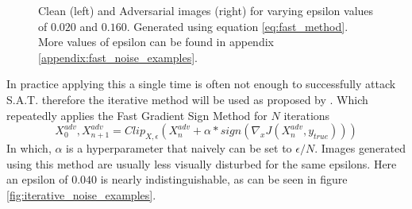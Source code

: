 \begin{figure}[H]
{        %
    }
    \caption{Clean (left) and Adversarial images (right) for varying epsilon values of $0.020$ and $0.160$. Generated using equation \ref{eq:fast_method}. More values of epsilon can be found in appendix \ref{appendix:fast_noise_examples}.}
    \label{fig:fast_noise_examples}
\end{figure}

In practice applying this a single time is often not enough to successfully attack S.A.T. therefore the iterative method will be used as proposed by \citeauthor{Kurakin}. Which repeatedly applies the Fast Gradient Sign Method for $N$ iterations
\begin{equation}
    X^{adv}_{0}, X^{adv}_{n + 1} = Clip_{X, \epsilon}(X^{adv}_{n} + \alpha * sign(\nabla_{x}J(X^{adv}_{n}, y_{true})))
    \label{eq:iterative_method}
\end{equation}
In which, $\alpha$ is a hyperparameter that naively can be set to $\epsilon / N$. Images generated using this method are usually less visually disturbed for the same epsilons. Here an epsilon of $0.040$ is nearly indistinguishable, as can be seen in figure \ref{fig:iterative_noise_examples}.

